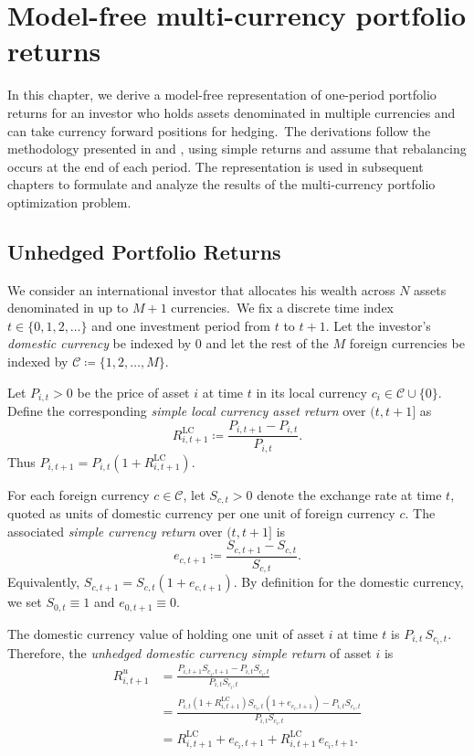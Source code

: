 \chapter{Model-free multi-currency portfolio returns} 
\label{chap:model-free-returns}

In this chapter, we derive a model-free representation of one-period portfolio returns for an investor who holds assets denominated in multiple currencies and can take currency forward positions for hedging.\ The derivations follow the methodology presented in \cite{BurkhardtUlrych2023} and \cite{LucescuUlrych2026}, using simple returns and assume that rebalancing occurs at the end of each period. The representation is used in subsequent chapters to formulate and analyze the results of the multi-currency portfolio optimization problem.

\section{Unhedged Portfolio Returns}

We consider an international investor that allocates his wealth across $N$ assets denominated in up to $M+1$ currencies.\ We fix a discrete time index $t\in\{0,1,2,\dots\}$ and one investment period from $t$ to $t{+}1$. Let the investor's \emph{domestic currency} be indexed by $0$ and let the rest of the $M$ foreign currencies be indexed by $\mathcal{C} \coloneqq \{1,2,\dots,M\}$.

Let $P_{i,t}>0$ be the price of asset $i$ at time $t$ in its local currency $c_i \in \mathcal{C}\cup \{0\}$. Define the corresponding \emph{simple local currency asset return} over $(t,t{+}1]$ as
\begin{equation*}
R^{\text{LC}}_{i,t+1} \coloneqq \frac{P_{i,t+1}-P_{i,t}}{P_{i,t}}.
\end{equation*}
Thus $P_{i,t+1}=P_{i,t}(1+R^{\text{LC}}_{i,t+1})$.

For each foreign currency $c\in\mathcal{C}$, let $S_{c,t} > 0$ denote the exchange rate at time $t$, quoted as units of domestic currency per one unit of foreign currency $c$. The associated \emph{simple currency return} over $(t,t{+}1]$ is
\begin{equation*}
e_{c,t+1} \coloneqq \frac{S_{c,t+1}-S_{c,t}}{S_{c,t}}.
\end{equation*}
Equivalently, $S_{c,t+1} = S_{c,t}(1+e_{c,t+1})$. By definition for the domestic currency, we set $S_{0,t}\equiv 1$ and $e_{0,t+1}\equiv 0$.

The domestic currency value of holding one unit of asset $i$ at time $t$ is $P_{i,t}\,S_{c_i,t}$. Therefore, the \emph{unhedged domestic currency simple return} of asset $i$ is
\begin{align}
R^{u}_{i,t+1}
&=
\frac{P_{i,t+1}S_{c_i,t+1} - P_{i,t}S_{c_i,t}}{P_{i,t}S_{c_i,t}}
\nonumber\\
&=
\frac{P_{i,t}(1+R^{\text{LC}}_{i,t+1}) S_{c_i,t}(1+e_{c_i,t+1}) - P_{i,t}S_{c_i,t}}{P_{i,t}S_{c_i,t}}
\nonumber\\
&=
R^{\text{LC}}_{i,t+1} + e_{c_i,t+1} + R^{\text{LC}}_{i,t+1}\,e_{c_i,t+1}.
\label{eq:unhedged-asset-return}
\end{align}

